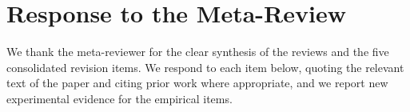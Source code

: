 \section*{Response to the Meta-Review}
We thank the meta-reviewer for the clear synthesis of the reviews and the five consolidated revision items. We respond to each item below, quoting the relevant text of the paper and citing prior work where appropriate, and we report new experimental evidence for the empirical items.






